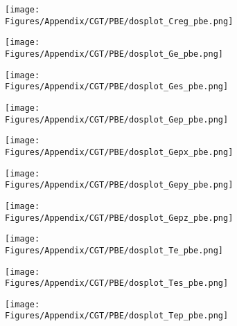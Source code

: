 \begin{figure}[H]
\begin{subfigure}{0.24\textwidth}
    \label{dosplot_Crt2g_pbe}
\end{subfigure}
\hfill
\begin{subfigure}{0.24\textwidth}
    \texttt{[image: Figures/Appendix/CGT/PBE/dosplot\_Creg\_pbe.png]}
    \label{dosplot_Creg_pbe}
\end{subfigure}
\hfill
\begin{subfigure}{0.24\textwidth}
    \texttt{[image: Figures/Appendix/CGT/PBE/dosplot\_Ge\_pbe.png]}
    \label{dosplot_Ge_pbe}
\end{subfigure}
\hfill
\begin{subfigure}{0.24\textwidth}
    \texttt{[image: Figures/Appendix/CGT/PBE/dosplot\_Ges\_pbe.png]}
    \label{dosplot_Ges_pbe}
\end{subfigure}
\hfill
\begin{subfigure}{0.24\textwidth}
    \texttt{[image: Figures/Appendix/CGT/PBE/dosplot\_Gep\_pbe.png]}
    \label{dosplot_Gep_pbe}
\end{subfigure}
\hfill
\begin{subfigure}{0.24\textwidth}
    \texttt{[image: Figures/Appendix/CGT/PBE/dosplot\_Gepx\_pbe.png]}
    \label{dosplot_Gepx_pbe}
\end{subfigure}
\hfill
\begin{subfigure}{0.24\textwidth}
    \texttt{[image: Figures/Appendix/CGT/PBE/dosplot\_Gepy\_pbe.png]}
    \label{dosplot_Gepy_pbe}
\end{subfigure}
\hfill
\begin{subfigure}{0.24\textwidth}
    \texttt{[image: Figures/Appendix/CGT/PBE/dosplot\_Gepz\_pbe.png]}
    \label{dosplot_Gepz_pbe}
\end{subfigure}
\hfill
\begin{subfigure}{0.24\textwidth}
    \texttt{[image: Figures/Appendix/CGT/PBE/dosplot\_Te\_pbe.png]}
    \label{dosplot_Te_pbe}
\end{subfigure}
\hfill
\begin{subfigure}{0.24\textwidth}
    \texttt{[image: Figures/Appendix/CGT/PBE/dosplot\_Tes\_pbe.png]}
    \label{dosplot_Tes_pbe}
\end{subfigure}
\hfill
\begin{subfigure}{0.24\textwidth}
    \texttt{[image: Figures/Appendix/CGT/PBE/dosplot\_Tep\_pbe.png]}
    \label{dosplot_Tep_pbe}
\end{subfigure}
\hfill
\begin{subfigure}{0.24\textwidth}

\end{subfigure}
\end{figure}

